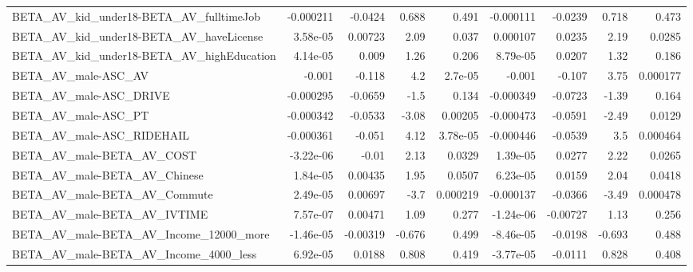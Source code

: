 \begin{tabular}{lrrrrrrrr}
BETA\_AV\_kid\_under18-BETA\_AV\_fulltimeJob            &   -0.000211 &      -0.0424 &    0.688 &    0.491 &  -0.000111 &     -0.0239 &        0.718 &         0.473 \\
BETA\_AV\_kid\_under18-BETA\_AV\_haveLicense            &    3.58e-05 &      0.00723 &     2.09 &    0.037 &   0.000107 &      0.0235 &         2.19 &        0.0285 \\
BETA\_AV\_kid\_under18-BETA\_AV\_highEducation          &    4.14e-05 &        0.009 &     1.26 &    0.206 &   8.79e-05 &      0.0207 &         1.32 &         0.186 \\
BETA\_AV\_male-ASC\_AV                                &      -0.001 &       -0.118 &      4.2 &  2.7e-05 &     -0.001 &      -0.107 &         3.75 &      0.000177 \\
BETA\_AV\_male-ASC\_DRIVE                             &   -0.000295 &      -0.0659 &     -1.5 &    0.134 &  -0.000349 &     -0.0723 &        -1.39 &         0.164 \\
BETA\_AV\_male-ASC\_PT                                &   -0.000342 &      -0.0533 &    -3.08 &  0.00205 &  -0.000473 &     -0.0591 &        -2.49 &        0.0129 \\
BETA\_AV\_male-ASC\_RIDEHAIL                          &   -0.000361 &       -0.051 &     4.12 & 3.78e-05 &  -0.000446 &     -0.0539 &          3.5 &      0.000464 \\
BETA\_AV\_male-BETA\_AV\_COST                          &   -3.22e-06 &        -0.01 &     2.13 &   0.0329 &   1.39e-05 &      0.0277 &         2.22 &        0.0265 \\
BETA\_AV\_male-BETA\_AV\_Chinese                       &    1.84e-05 &      0.00435 &     1.95 &   0.0507 &   6.23e-05 &      0.0159 &         2.04 &        0.0418 \\
BETA\_AV\_male-BETA\_AV\_Commute                       &    2.49e-05 &      0.00697 &     -3.7 & 0.000219 &  -0.000137 &     -0.0366 &        -3.49 &      0.000478 \\
BETA\_AV\_male-BETA\_AV\_IVTIME                        &    7.57e-07 &      0.00471 &     1.09 &    0.277 &  -1.24e-06 &    -0.00727 &         1.13 &         0.256 \\
BETA\_AV\_male-BETA\_AV\_Income\_12000\_more             &   -1.46e-05 &     -0.00319 &   -0.676 &    0.499 &  -8.46e-05 &     -0.0198 &       -0.693 &         0.488 \\
BETA\_AV\_male-BETA\_AV\_Income\_4000\_less              &    6.92e-05 &       0.0188 &    0.808 &    0.419 &  -3.77e-05 &     -0.0111 &        0.828 &         0.408 \\

\end{tabular}
